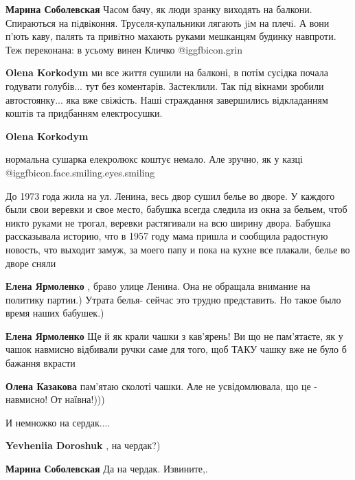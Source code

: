 \begin{itemize}
\begin{itemize}
\begin{itemize}
\textbf{Марина Соболевская} Часом бачу, як люди зранку виходять на балкони. Спираються на пiдвiконня. Труселя-купальники лягають jiм на плечi. А вони п'ють каву, палять та привiтно махають руками мешканцям будинку навпроти. Теж переконана: в усьому винен Кличко  @igg{fbicon.grin} 

\textbf{Olena Korkodym} ми все життя сушили на балконі, в потім сусідка почала годувати голубів... тут без коментарів. Застеклили. Так під вікнами зробили автостоянку... яка вже свіжість. Наші страждання завершились відкладанням коштів та придбанням електросушки.
\end{itemize} %

\textbf{Olena Korkodym} 

нормальна сушарка елекролюкс коштує немало. Але зручно, як у казці
@igg{fbicon.face.smiling.eyes.smiling} 

\end{itemize} %


До 1973 года жила на ул. Ленина, весь двор сушил белье во дворе. У каждого были
свои веревки и свое место, бабушка всегда следила из окна за бельем, чтоб никто
руками не трогал, веревки растягивали на всю ширину двора. Бабушка рассказывала
историю, что в 1957 году мама пришла и сообщила радостную новость, что выходит
замуж, за моего папу и пока на кухне все плакали, белье во дворе сняли

\begin{itemize} %
\textbf{Елена Ярмоленко} , браво улице Ленина. Она не обращала внимание на политику партии.) Утрата белья- сейчас это трудно представить. Но такое было время наших бабушек.)

\textbf{Елена Ярмоленко} Ще й як крали чашки з кав'ярень! Ви що не пам'ятаєте, як у чашок навмисно відбивали ручки саме для того, щоб ТАКУ чашку вже не було б бажання вкрасти

\textbf{Олена Казакова} пам'ятаю сколоті чашки. Але не усвідомлювала, що це - навмисно! От наївна!)))
\end{itemize} %

И немножко на сердак....

\begin{itemize} %
\textbf{Yevheniia Doroshuk} , на чердак?)

\textbf{Марина Соболевская} Да на чердак. Извините,.
\end{itemize} %


\end{itemize}
